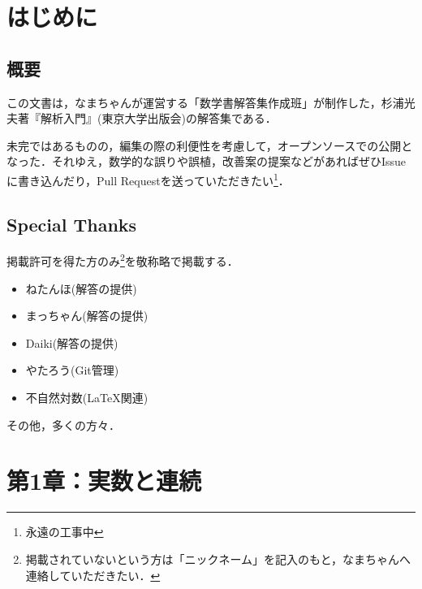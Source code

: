 \documentclass[uplatex,dvipdfmx,a4paper,10pt,fleqn]{jsarticle}
\begin{document}


\thispagestyle{empty}

\newpage
{}
\pagecolor{white}

\begin{multicols}{3}
\tableofcontents
\end{multicols}

\newpage 

\section*{はじめに}


\subsection*{概要}

この文書は，なまちゃんが運営する「数学書解答集作成班」が制作した，杉浦光夫著『解析入門』(東京大学出版会)の解答集である．

未完ではあるものの，編集の際の利便性を考慮して，オープンソースでの公開となった．それゆえ，数学的な誤りや誤植，改善案の提案などがあればぜひIssueに書き込んだり，Pull Requestを送っていただきたい\footnote{永遠の工事中}．


\subsection*{Special Thanks}

掲載許可を得た方のみ\footnote{掲載されていないという方は「ニックネーム」を記入のもと，なまちゃんへ連絡していただきたい．}を敬称略で掲載する．
\begin{itemize}
    \item ねたんほ(解答の提供)
    \item まっちゃん(解答の提供)
    \item Daiki(解答の提供)
    \item やたろう(Git管理)
    \item 不自然対数(\LaTeX 関連)
\end{itemize}

その他，多くの方々．

\newpage 
\section*{第1章：実数と連続}
\end{document}

